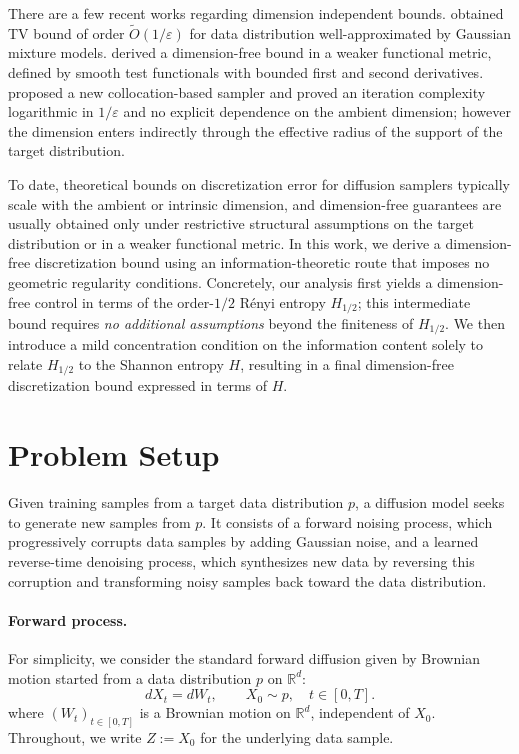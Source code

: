 \documentclass[11pt]{article}
\theoremstyle{definition}
\numberwithin{equation}{section}
\begin{document}
There are a few recent works regarding dimension independent bounds. \cite{li2025dimension} obtained TV bound of order $\tilde O (1/\varepsilon)$ for data distribution well-approximated by Gaussian mixture models. 
\cite{de2025dimension} derived a dimension-free bound in a weaker functional metric, defined by smooth test functionals with bounded first and second derivatives. \cite{gatmiry2026high} proposed a new collocation-based sampler and proved an iteration complexity logarithmic in $1/\varepsilon$ and no explicit dependence on the ambient dimension; however the dimension enters indirectly through the effective radius of the support of the target distribution.

To date, theoretical bounds on discretization error for diffusion samplers typically scale with the ambient or intrinsic dimension, and dimension-free guarantees are usually obtained only under restrictive structural assumptions on the target distribution or in a weaker functional metric. In this work, we derive a dimension-free discretization bound using an information-theoretic route that imposes no geometric regularity conditions. Concretely, our analysis first yields a dimension-free control in terms of the order-$1/2$ R\'enyi entropy $H_{1/2}$; this intermediate bound requires \emph{no additional assumptions} beyond the finiteness of $H_{1/2}$. We then introduce a mild concentration condition on the information content solely to relate $H_{1/2}$ to the Shannon entropy $H$, resulting in a final dimension-free discretization bound expressed in terms of $H$.
\section{Problem Setup}
Given training samples from a target data distribution $p$, a diffusion model seeks to generate new samples from $p$. It consists of a forward noising process, which progressively corrupts data samples by adding Gaussian noise, and a learned reverse-time denoising process, which synthesizes new data by reversing this corruption and transforming noisy samples back toward the data distribution.

\paragraph{Forward process.}
For simplicity, we consider the standard forward diffusion given by Brownian motion started from a data distribution $p$ on $\mathbb{R}^d$:
\begin{equation*}
dX_t = dW_t,\qquad X_0\sim p,\quad t\in[0,T].
\end{equation*}
where $(W_t)_{t\in[0,T]}$ is a Brownian motion on $\mathbb{R}^d$, independent of $X_0$. Throughout, we write $Z:=X_0$ for the underlying data sample.
\end{document}
